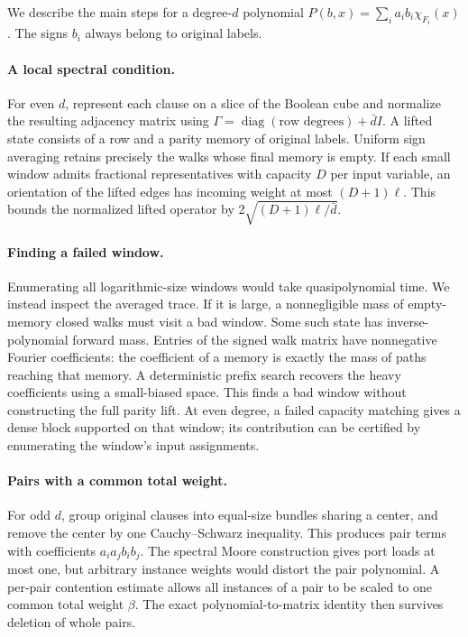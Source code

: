 \documentclass[letterpaper,11pt]{article}
\theoremstyle{definition}
\DeclareMathOperator{\diag}{diag}
\begin{document}
We describe the main steps for a degree-$d$ polynomial
$P(b,x)=\sum_i a_i b_i\chi_{F_i}(x)$. The signs $b_i$ always belong
to original labels.

\paragraph{A local spectral condition.}
For even $d$, represent each clause on a slice of the Boolean cube
and normalize the resulting adjacency matrix using
$\Gamma=\diag(\text{row degrees})+\bar d I$. A lifted state
consists of a row and a parity memory of original labels. Uniform
sign averaging retains precisely the walks whose final memory is
empty. If each small window admits fractional representatives with
capacity $D$ per input variable, an orientation of the lifted edges
has incoming weight at most $(D+1)\ell$. This bounds the normalized
lifted operator by $2\sqrt{(D+1)\ell/\bar d}$.

\paragraph{Finding a failed window.}
Enumerating all logarithmic-size windows would take quasipolynomial
time. We instead inspect the averaged trace. If it is large, a
nonnegligible mass of empty-memory closed walks must visit a bad
window. Some such state has inverse-polynomial forward mass. Entries
of the signed walk matrix have nonnegative Fourier coefficients:
the coefficient of a memory is exactly the mass of paths reaching
that memory. A deterministic prefix search recovers the heavy
coefficients using a small-biased space. This finds a bad window
without constructing the full parity lift. At even degree, a failed
capacity matching gives a dense block supported on that window;
its contribution can be certified by enumerating the window's input
assignments.

\paragraph{Pairs with a common total weight.}
For odd $d$, group original clauses into equal-size bundles sharing
a center, and remove the center by one Cauchy--Schwarz inequality.
This produces pair terms with coefficients $a_i a_j b_i b_j$.
The spectral Moore construction gives port loads at most one, but
arbitrary instance weights would distort the pair polynomial.
A per-pair contention estimate allows all instances of a pair to
be scaled to one common total weight $\beta$. The exact
polynomial-to-matrix identity then survives deletion of whole pairs.
\end{document}
